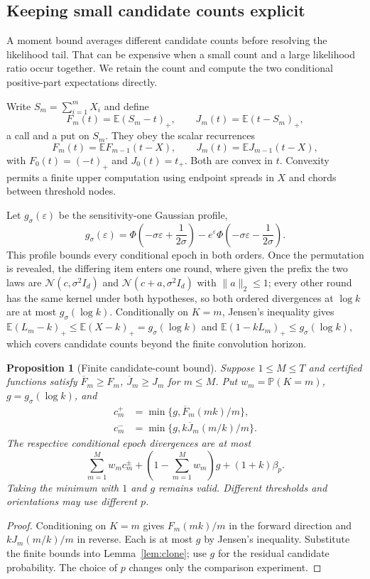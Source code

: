 \documentclass[conference]{IEEEtran}
\newtheorem{proposition}[theorem]{Proposition}
\newcommand{\E}{\mathbb E}
\newcommand{\N}{\mathcal N}
\newcommand{\Prb}{\mathbb P}
\newcommand{\eps}{\varepsilon}
\begin{document}
\subsection{Keeping small candidate counts explicit}
A moment bound averages different candidate counts before resolving the likelihood tail. That can be expensive when a small count and a large likelihood ratio occur together. We retain the count and compute the two conditional positive-part expectations directly.

Write $S_m=\sum_{i=1}^mX_i$ and define
\[
 F_m(t)=\E(S_m-t)_+,\qquad J_m(t)=\E(t-S_m)_+,
\]
a call and a put on $S_m$.
They obey the scalar recurrences
\begin{equation}\label{eq:recurrences}
 F_m(t)=\E F_{m-1}(t-X),\qquad
 J_m(t)=\E J_{m-1}(t-X),
\end{equation}
with $F_0(t)=(-t)_+$ and $J_0(t)=t_+$. Both are convex in $t$. Convexity permits a finite upper computation using endpoint spreads in $X$ and chords between threshold nodes.

Let $g_\sigma(\eps)$ be the sensitivity-one Gaussian profile,
\begin{equation}\label{eq:gaussian}
 g_\sigma(\eps)=\Phi\left(-\sigma\eps+\frac1{2\sigma}\right)
 -e^\eps\Phi\left(-\sigma\eps-\frac1{2\sigma}\right).
\end{equation}
This profile bounds every conditional epoch in both orders. Once the permutation is revealed, the differing item enters one round, where given the prefix the two laws are $\N(c,\sigma^2I_d)$ and $\N(c+a,\sigma^2I_d)$ with $\|a\|_2\le1$; every other round has the same kernel under both hypotheses, so both ordered divergences at $\log k$ are at most $g_\sigma(\log k)$. Conditionally on $K=m$, Jensen's inequality gives $\E(L_m-k)_+\le\E(X-k)_+=g_\sigma(\log k)$ and $\E(1-kL_m)_+\le g_\sigma(\log k)$, which covers candidate counts beyond the finite convolution horizon.

\begin{proposition}[Finite candidate-count bound]\label{prop:counts}
Suppose $1\le M\le T$ and certified functions satisfy $\overline F_m\ge F_m$, $\overline J_m\ge J_m$ for $m\le M$. Put $w_m=\Prb(K=m)$, $g=g_\sigma(\log k)$, and
\[
\begin{aligned}
 c_m^+&=\min\{g,\overline F_m(mk)/m\},\\
 c_m^-&=\min\{g,k\overline J_m(m/k)/m\}.
\end{aligned}
\]
The respective conditional epoch divergences are at most
\begin{equation}\label{eq:finite-count}
 \sum_{m=1}^Mw_mc_m^\pm+
 \left(1-\sum_{m=1}^Mw_m\right)g+(1+k)\beta_p.
\end{equation}
Taking the minimum with $1$ and $g$ remains valid. Different thresholds and orientations may use different $p$.
\end{proposition}
\begin{proof}
Conditioning on $K=m$ gives $F_m(mk)/m$ in the forward direction and $kJ_m(m/k)/m$ in reverse. Each is at most $g$ by Jensen's inequality. Substitute the finite bounds into Lemma~\ref{lem:clone}; use $g$ for the residual candidate probability. The choice of $p$ changes only the comparison experiment.
\end{proof}
\end{document}
